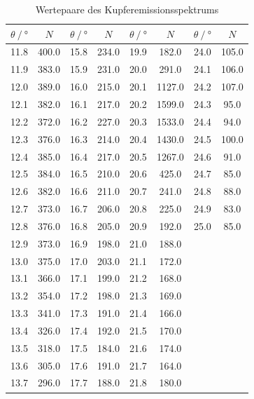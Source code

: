 \begin{table}[H]    
    \centering
    \caption{Wertepaare des Kupferemissionsspektrums}
    \label{Tabelle1}
    \begin{tabular} {c  c| c  c| c  c| c  c}
        \toprule
        {$ \theta \mathbin{/} \unit{\degree}$} &
        {$ N $} &
        {$ \theta \mathbin{/} \unit{\degree} $} &
        {$ N $} &
        {$ \theta \mathbin{/} \unit{\degree} $} &
        {$ N $} &
        {$ \theta \mathbin{/} \unit{\degree}$} &
        {$ N $} \\
        \midrule
        11.8 & 400.0 & 15.8 & 234.0 & 19.9 & 182.0  & 24.0 & 105.0 \\
        11.9 & 383.0 & 15.9 & 231.0 & 20.0 & 291.0  & 24.1 & 106.0 \\
        12.0 & 389.0 & 16.0 & 215.0 & 20.1 & 1127.0 & 24.2 & 107.0 \\
        12.1 & 382.0 & 16.1 & 217.0 & 20.2 & 1599.0 & 24.3 & 95.0  \\
        12.2 & 372.0 & 16.2 & 227.0 & 20.3 & 1533.0 & 24.4 & 94.0  \\
        12.3 & 376.0 & 16.3 & 214.0 & 20.4 & 1430.0 & 24.5 & 100.0 \\
        12.4 & 385.0 & 16.4 & 217.0 & 20.5 & 1267.0 & 24.6 & 91.0  \\
        12.5 & 384.0 & 16.5 & 210.0 & 20.6 & 425.0  & 24.7 & 85.0  \\
        12.6 & 382.0 & 16.6 & 211.0 & 20.7 & 241.0  & 24.8 & 88.0  \\
        12.7 & 373.0 & 16.7 & 206.0 & 20.8 & 225.0  & 24.9 & 83.0  \\
        12.8 & 376.0 & 16.8 & 205.0 & 20.9 & 192.0  & 25.0 & 85.0  \\
        12.9 & 373.0 & 16.9 & 198.0 & 21.0 & 188.0  \\
        13.0 & 375.0 & 17.0 & 203.0 & 21.1 & 172.0  \\
        13.1 & 366.0 & 17.1 & 199.0 & 21.2 & 168.0  \\
        13.2 & 354.0 & 17.2 & 198.0 & 21.3 & 169.0  \\
        13.3 & 341.0 & 17.3 & 191.0 & 21.4 & 166.0  \\
        13.4 & 326.0 & 17.4 & 192.0 & 21.5 & 170.0  \\
        13.5 & 318.0 & 17.5 & 184.0 & 21.6 & 174.0  \\
        13.6 & 305.0 & 17.6 & 191.0 & 21.7 & 164.0  \\
        13.7 & 296.0 & 17.7 & 188.0 & 21.8 & 180.0  \\

\end{tabular}
\end{table}
